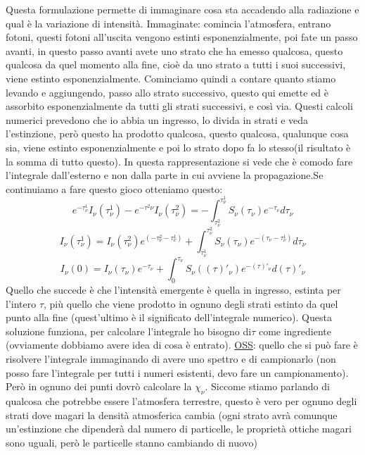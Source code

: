 \documentclass[a4paper,11pt]{article}
\begin{document}
Questa formulazione permette di immaginare cosa sta accadendo alla radiazione e qual è la variazione di intensità.
Immaginate: comincia l'atmosfera, entrano fotoni, questi fotoni all'uscita vengono estinti esponenzialmente, poi fate un passo avanti, in questo passo avanti avete uno strato che ha emesso qualcosa, questo qualcosa da quel momento alla fine, cioè da uno strato a tutti i suoi successivi, viene estinto esponenzialmente.
\newline
Cominciamo quindi a contare quanto stiamo levando e aggiungendo, passo allo strato successivo, questo qui emette ed è assorbito esponenzialmente da tutti gli strati successivi, e così via.
Questi calcoli numerici prevedono che io abbia un ingresso, lo divida in strati e veda l'estinzione, però questo ha prodotto qualcosa, questo qualcosa, qualunque cosa sia, viene estinto esponenzialmente e poi lo strato dopo fa lo stesso(il risultato è la somma di tutto questo).
\newline
In questa rappresentazione si vede che è comodo fare l'integrale dall'esterno e non dalla parte in cui avviene la propagazione.Se continuiamo a fare questo gioco otteniamo questo:
$$
e^{-\tau^1_\nu}I_\nu(\tau^1_\nu)-e^{-\tau^2\nu}I_\nu(\tau^2_\nu)=-\int_{\tau^2_\nu}^{\tau^1_\nu} S_\nu(\tau_\nu)e^{-\tau_\nu}d\tau_\nu
$$
$$
I_\nu(\tau^1_\nu)=I_\nu(\tau^2_\nu)e^(-\tau^2_\nu-\tau^1_\nu)+\int^{\tau^2_\nu}_{\tau^1_\nu}S_\nu(\tau_\nu)e^{-(\tau_\nu-\tau^1_\nu)}d\tau_\nu
$$
$$
I_\nu(0)=I_\nu(\tau_\nu)e^{-\tau_\nu}+\int^{\tau_\nu}_0 S_\nu((\tau)'_\nu)e^{-(\tau)'_\nu}d(\tau)'_\nu
$$
Quello che succede è che l'intensità emergente è quella in ingresso, estinta per l'intero $\tau$, più quello che viene prodotto in ognuno degli strati estinto da quel punto alla fine (quest'ultimo è il significato dell'integrale numerico).
\newline
Questa soluzione funziona, per calcolare l'integrale ho bisogno di$\tau$ come ingrediente (ovviamente dobbiamo avere idea di cosa è entrato).
\newline
\underline{OSS}: quello che si può fare è risolvere l'integrale immaginando di avere uno spettro e di campionarlo (non posso fare l'integrale per tutti i numeri esistenti, devo fare un campionamento).
\newline
Però in ognuno dei punti dovrò calcolare la $\chi_\nu$. Siccome stiamo parlando di qualcosa che potrebbe essere l'atmosfera terrestre, questo è vero per ognuno degli strati dove magari la densità atmosferica cambia (ogni strato avrà comunque un'estinzione che dipenderà dal numero di particelle, le proprietà ottiche magari sono uguali, però le particelle stanno cambiando di nuovo)
\end{document}
